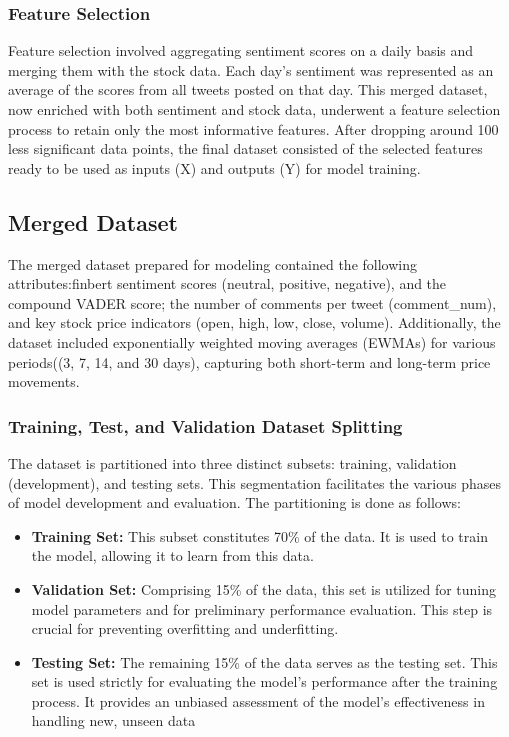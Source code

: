 \documentclass[11pt,a4paper]{article}
\begin{document}
\subsubsection{Feature Selection}
Feature selection involved aggregating sentiment scores on a daily basis and merging them with the stock data. Each day's sentiment was represented as an average of the scores from all tweets posted on that day. This merged dataset, now enriched with both sentiment and stock data, underwent a feature selection process to retain only the most informative features. After dropping around 100 less significant data points, the final dataset consisted of the selected features ready to be used as inputs (X) and outputs (Y) for model training.

\subsection{Merged Dataset }

The merged dataset prepared for modeling contained the following attributes:finbert sentiment scores (neutral, positive, negative), and the compound VADER score; the number of comments per tweet (comment\_num), and key stock price indicators (open, high, low, close, volume). Additionally, the dataset included exponentially weighted moving averages (EWMAs) for various periods((3, 7, 14,
and 30 days), capturing both short-term and long-term price movements.



\subsubsection{Training, Test, and Validation Dataset Splitting}

The dataset is partitioned into three distinct subsets: training, validation (development), and testing sets. This segmentation facilitates the various phases of model development and evaluation. The partitioning is done as follows:


\begin{itemize}
    \item \textbf{Training Set:} This subset constitutes 70\% of the data. It is used to train the model, allowing it to learn from this data.
    \item \textbf{Validation Set:} Comprising 15\% of the data, this set is utilized for tuning model parameters and for preliminary performance evaluation. This step is crucial for preventing overfitting and underfitting.
    \item \textbf{Testing Set:} The remaining 15\% of the data serves as the testing set. This set is used strictly for evaluating the model's performance after the training process. It provides an unbiased assessment of the model's effectiveness in handling new, unseen data

\end{itemize}
\end{document}
